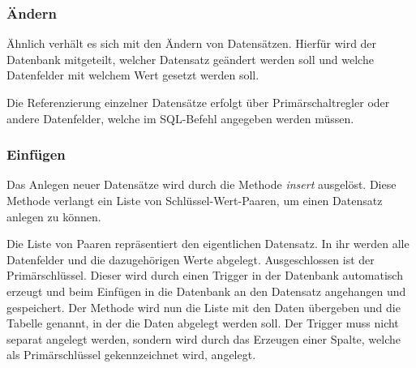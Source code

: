 \subsubsection{Ändern}

Ähnlich verhält es sich mit den Ändern von Datensätzen. Hierfür wird der Datenbank mitgeteilt, welcher Datensatz geändert werden soll und welche Datenfelder mit welchem Wert gesetzt werden soll.

Die Referenzierung einzelner Datensätze erfolgt über Primärschaltregler oder andere Datenfelder, welche im SQL-Befehl angegeben werden müssen.

\subsubsection{Einfügen}

Das Anlegen neuer Datensätze wird durch die Methode \textit{insert} ausgelöst. Diese Methode verlangt ein Liste von Schlüssel-Wert-Paaren, um einen Datensatz anlegen zu können.

Die Liste von Paaren repräsentiert den eigentlichen Datensatz. In ihr werden alle Datenfelder und die dazugehörigen Werte abgelegt. Ausgeschlossen ist der Primärschlüssel. Dieser wird durch einen Trigger in der Datenbank automatisch erzeugt und beim Einfügen in die Datenbank an den Datensatz angehangen und gespeichert. Der Methode wird nun die Liste mit den Daten übergeben und die Tabelle genannt, in der die Daten abgelegt werden soll. Der Trigger muss nicht separat angelegt werden, sondern wird durch das Erzeugen einer Spalte, welche als Primärschlüssel gekennzeichnet wird, angelegt.